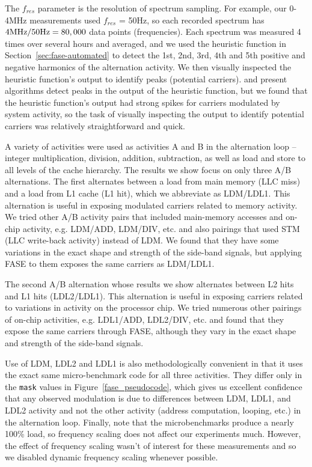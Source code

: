 The $f_{res}$ parameter is the resolution of spectrum sampling. For example, our 0-4MHz measurements used $f_{res}$ = 50Hz, so each recorded spectrum has $4\rm{MHz}/50\rm{Hz} = 80,000$ data points (frequencies). Each spectrum was measured 4 times over several hours and averaged, and we used the heuristic function in Section~\ref{sec:fase-automated} to detect the 1st, 2nd, 3rd, 4th and 5th positive and negative harmonics of the alternation activity. We then visually inspected the heuristic function's output to identify peaks (potential carriers). \cite{palshikar_2009} and \cite{alfassi_2009} present algorithms detect peaks in the output of the heuristic function, but we found that the heuristic function's output had strong spikes for carriers modulated by system activity, so the task of visually inspecting the output to identify potential carriers was relatively straightforward and quick.

A variety of activities were used as activities A and B in the alternation loop -- integer multiplication, division, addition, subtraction, as well as load and store to all levels of the cache hierarchy. The results we show focus on only three A/B alternations. The first alternates between a load from main memory (LLC miss) and a load from L1 cache (L1 hit), which we abbreviate as LDM/LDL1. This alternation is useful in exposing modulated carriers related to memory activity. We tried other A/B activity pairs that included main-memory accesses and on-chip activity, e.g. LDM/ADD, LDM/DIV, etc. and also pairings that used STM (LLC write-back activity) instead of LDM. We found that they have some variations in the exact shape and strength of the side-band signals, but applying FASE to them exposes the same carriers as LDM/LDL1.

The second A/B alternation whose results we show alternates between L2 hits and L1 hits (LDL2/LDL1). This alternation is useful in exposing carriers related to variations in activity on the processor chip. We tried numerous other pairings of on-chip activities, e.g. LDL1/ADD, LDL2/DIV, etc. and found that they expose the same carriers through FASE, although they vary in the exact shape and strength of the side-band signals.

Use of LDM, LDL2 and LDL1 is also methodologically convenient in that it uses the exact same micro-benchmark code for all three activities. They differ only in the \texttt{mask} values in Figure~\ref{fase_pseudocode}, which gives us excellent confidence that any observed modulation is due to differences between LDM, LDL1, and LDL2 activity and not the other activity (address computation, looping, etc.) in the alternation loop. Finally, note that the microbenchmarks produce a nearly 100\% load, so frequency scaling does not affect our experiments much. However, the effect of frequency scaling wasn't of interest for these measurements and so we disabled dynamic frequency scaling whenever possible.
